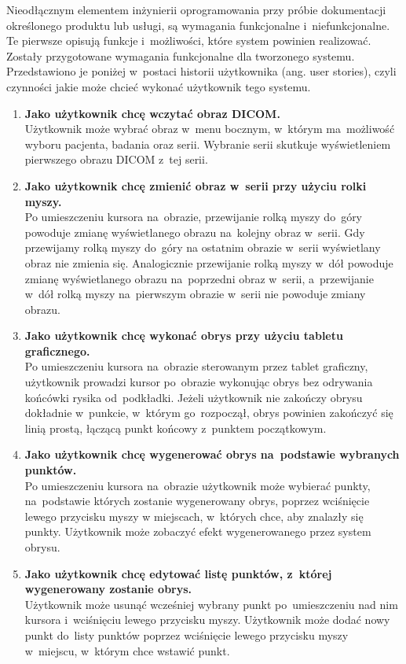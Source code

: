 \documentclass[a4paper,11pt,twoside,openright]{report}
\theoremstyle{definition}
\begin{document}
Nieodłącznym elementem inżynierii oprogramowania przy próbie dokumentacji
określonego produktu lub usługi, są wymagania funkcjonalne i~niefunkcjonalne.
Te pierwsze opisują funkcje i~możliwości, które system powinien realizować.
Zostały przygotowane wymagania funkcjonalne dla tworzonego systemu. Przedstawiono
je poniżej w~postaci historii użytkownika (ang. user stories), czyli czynności
jakie może chcieć wykonać użytkownik tego systemu.
\begin{enumerate}
\item \textbf {Jako użytkownik chcę wczytać obraz DICOM.} \\
Użytkownik może wybrać obraz w~menu bocznym, w~którym ma~możliwość wyboru pacjenta,
badania oraz serii. Wybranie serii skutkuje wyświetleniem pierwszego obrazu DICOM z~tej serii.

\item \textbf {Jako użytkownik chcę zmienić obraz w~serii przy użyciu rolki myszy.} \\
Po umieszczeniu kursora na~obrazie, przewijanie rolką myszy do~góry powoduje zmianę
wyświetlanego obrazu na~kolejny obraz w~serii. Gdy przewijamy rolką myszy do~góry
na ostatnim obrazie w~serii wyświetlany obraz nie zmienia się. Analogicznie
przewijanie rolką myszy w~dół powoduje zmianę wyświetlanego obrazu na~poprzedni
obraz w~serii, a~przewijanie w~dół rolką myszy na~pierwszym obrazie w~serii nie
powoduje zmiany obrazu.

\item \textbf {Jako użytkownik chcę wykonać obrys przy użyciu tabletu graficznego.} \\
Po umieszczeniu kursora na~obrazie sterowanym przez tablet graficzny, użytkownik
prowadzi kursor po~obrazie wykonując obrys bez odrywania końcówki rysika od~podkładki.
Jeżeli użytkownik nie zakończy obrysu dokładnie w~punkcie, w~którym go~rozpoczął,
obrys powinien zakończyć się linią prostą, łączącą punkt końcowy z~punktem początkowym.

\item \textbf {Jako użytkownik chcę wygenerować obrys na~podstawie wybranych punktów.} \\
Po umieszczeniu kursora na~obrazie użytkownik może wybierać punkty, na~podstawie
których zostanie wygenerowany obrys, poprzez wciśnięcie lewego przycisku myszy w
miejscach, w~których chce, aby znalazły się punkty. Użytkownik może zobaczyć efekt
wygenerowanego przez system obrysu.

\item \textbf {Jako użytkownik chcę edytować listę punktów, z~której wygenerowany zostanie obrys.} \\
Użytkownik może usunąć wcześniej wybrany punkt po~umieszczeniu nad nim kursora i~wciśnięciu
lewego przycisku myszy. Użytkownik może dodać nowy punkt do~listy punktów
poprzez wciśnięcie lewego przycisku myszy w~miejscu, w~którym chce wstawić punkt.


\end{enumerate}
\end{document}
